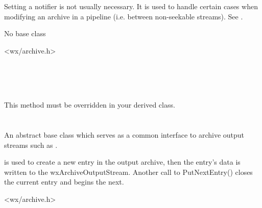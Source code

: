 Setting a notifier is not usually necessary. It is used to handle
certain cases when modifying an archive in a pipeline (i.e. between
non-seekable streams).
See .


No base class


<wx/archive.h>


\\
\\
\\



\label{wxarchivenotifieronentryupdated}


This method must be overridden in your derived class.


%
%

\section{}\label{wxarchiveoutputstream}

An abstract base class which serves as a common interface to
archive output streams such as .

 is used
to create a new entry in the output archive, then the entry's data is
written to the wxArchiveOutputStream.  Another call to PutNextEntry()
closes the current entry and begins the next.




<wx/archive.h>


\\
\\

